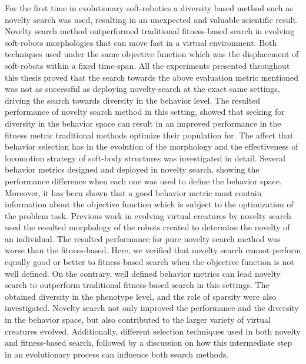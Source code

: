 For the first time in evolutionary soft-robotics a diversity based method such as novelty search was used, resulting in an unexpected and valuable scientific result. Novelty search method outperformed traditional fitness-based search in evolving soft-robots morphologies that can move fast in a virtual environment.
Both techniques used under the same objective function which was the displacement of soft-robots within a fixed time-span. All the experiments presented throughout this thesis proved that the search towards the above evaluation metric mentioned was not as successful as deploying novelty-search at the exact same settings, driving the search towards diversity in the behavior level. The resulted performance of novelty search method in this setting, showed that seeking for diversity in the behavior space can result in an improved performance in the fitness metric traditional methods optimize their population for. The affect that behavior selection has in the evolution of the morphology and the effectiveness of locomotion strategy of soft-body structures was investigated in detail. Several behavior metrics designed and deployed in novelty search, showing the performance difference when each one was used to define the behavior space. Moreover, it has been shown that a good behavior metric must contain information about the objective function which is subject to the optimization of the problem task. Previous work in evolving virtual creatures by novelty search~\citep{lehman2011evolving} used the resulted morphology of the robots created to determine the novelty of an individual. The resulted performance for pure novelty search method was worse than the fitness-based. Here, we verified that novelty search cannot perform equally good or better to fitness-based search when the objective function is not well defined. On the contrary, well defined behavior metrics can lead novelty search to outperform traditional fitness-based search in this settings. The obtained diversity in the phenotype level, and the role of sparsity were also investigated. Novelty search not only improved the performance and the diversity in the behavior space, but also contributed to the larger variety of virtual creatures evolved. Additionally, different selection techniques used in both novelty and fitness-based search, followed by a discussion on how this intermediate step in an evolutionary process can influence both search methods. 

